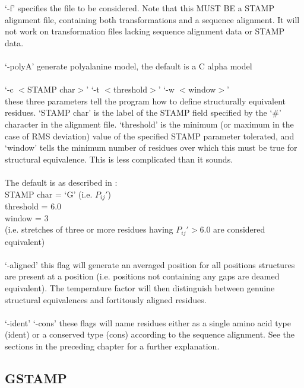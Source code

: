 `-f' specifies the file to be considered.  Note that this MUST BE 
  a STAMP alignment file, containing both transformations and a
  sequence alignment.  It will not work on transformation files
  lacking sequence alignment data or STAMP data.\\
\\
`-polyA' generate  polyalanine model, the default is a C alpha
   model\\
\\
`-c $<$STAMP char$>$' `-t $<$threshold$>$' `-w $<$window$>$'\\
  these three parameters tell the program how to define structurally
  equivalent residues.  `STAMP char' is the label of the STAMP field
  specified by the `\#' character  in the alignment file.
  `threshold' is the minimum (or maximum in the case of RMS deviation)
  value of the specified STAMP parameter tolerated, and `window' tells
  the minimum number of residues over which this must be true for 
  structural equivalence.  This is less complicated than it sounds.\\
\\
  The default is as described in \cite{rb92b}:\\  
   STAMP char = `G' (i.e. $P_{ij}{\prime}$)\\
   threshold  = 6.0\\
   window     = 3 \\
   (i.e. stretches of three or more residues having $P_{ij}{\prime} > 6.0$
     are considered equivalent)\\
\\
`-aligned' this flag will generate an averaged position for all positions
  structures are present at a position (i.e. positions not containing any 
  gaps are deamed equivalent).   The temperature factor will then distinguish
  between genuine structural equivalences and fortitously aligned residues.\\
\\
`-ident' `-cons'  these flags will name residues either as a single amino acid
  type (ident) or a conserved type (cons) according to the sequence alignment.
  See the sections in the preceding chapter for a further explanation.


\subsection{GSTAMP}

